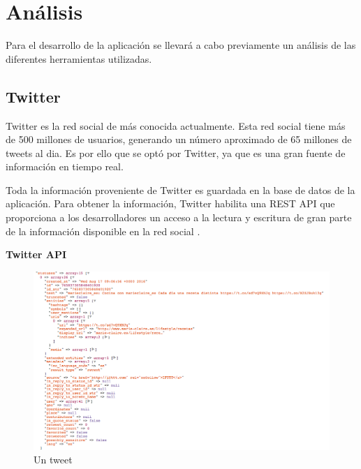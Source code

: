 \section{Análisis}

Para el desarrollo de la aplicación se llevará a cabo previamente un análisis de las diferentes herramientas utilizadas.

\subsection{Twitter}

Twitter es la red social de  más conocida actualmente. Esta red social tiene más de 500 millones de usuarios, generando un número aproximado de 65 millones de tweets al dia.
Es por ello que se optó por Twitter, ya que es una gran fuente de información en tiempo real.

\vspace{5 mm}

Toda la información proveniente de Twitter es guardada en la base de datos de la aplicación. Para obtener la información,
Twitter habilita una REST API que proporciona a los desarrolladores un acceso a la lectura y escritura de gran parte de la información disponible
en la red social \cite{twitter-api}.

\vspace{5 mm}

\textbf{Twitter API}

\vspace{5 mm}

\begin{landscape}
\begin{figure}
\begin{center}
\includegraphics[width=16cm]{imagenes/estructura-tweet.png}
\caption{Un tweet}
\label{tweet}
\end{center}
\end{figure}
\end{landscape}

